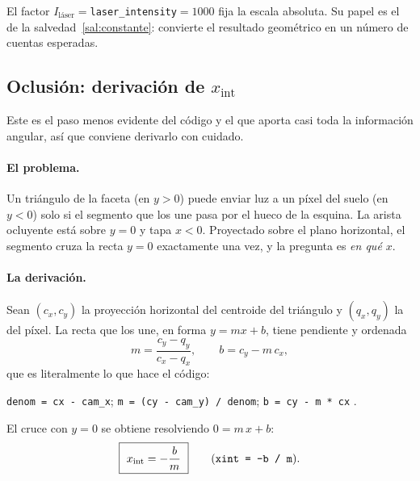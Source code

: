 \documentclass[11pt,a4paper]{article}
\newcommand{\code}[1]{\texttt{#1}}
\theoremstyle{definition}
\theoremstyle{plain}
\begin{document}
El factor $I_{\text{láser}}=$\code{laser\_intensity}$=1000$ fija la escala
absoluta. Su papel es el de la salvedad~\ref{sal:constante}: convierte el
resultado geométrico en un número de cuentas esperadas.

\subsection{Oclusión: derivación de \texorpdfstring{$x_{\text{int}}$}{x\_int}}
\label{sec:oclusion}

Este es el paso menos evidente del código y el que aporta casi toda la
información angular, así que conviene derivarlo con cuidado.

\paragraph{El problema.}
Un triángulo de la faceta (en $y>0$) puede enviar luz a un píxel del suelo (en
$y<0$) solo si el segmento que los une pasa por el hueco de la esquina. La
arista ocluyente está sobre $y=0$ y tapa $x<0$. Proyectado sobre el plano
horizontal, el segmento cruza la recta $y=0$ exactamente una vez, y la pregunta
es \emph{en qué $x$}.

\paragraph{La derivación.}
Sean $(c_x,c_y)$ la proyección horizontal del centroide del triángulo y
$(q_x,q_y)$ la del píxel. La recta que los une, en forma $y=mx+b$, tiene
pendiente y ordenada
%
\begin{equation}
\label{eq:mb}
m = \frac{c_y-q_y}{c_x-q_x},
\qquad
b = c_y - m\,c_x ,
\end{equation}
%
que es literalmente lo que hace el código:
%
\begin{center}
\code{denom = cx - cam\_x};\quad
\code{m = (cy - cam\_y) / denom};\quad
\code{b = cy - m * cx} .
\end{center}
%
El cruce con $y=0$ se obtiene resolviendo $0=m\,x+b$:
%
\begin{equation}
\label{eq:xint}
\boxed{\ x_{\text{int}} = -\frac{b}{m}\ }
\qquad\text{(\code{xint = -b / m})}.
\end{equation}
\end{document}
